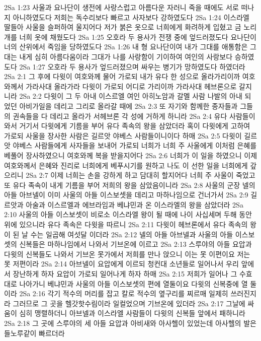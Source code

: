 2Sa 1:23  사울과 요나단이 생전에 사랑스럽고 아름다운 자러니 죽을 때에도 서로 떠나지 아니하였도다 저희는 독수리보다 빠르고 사자보다 강하였도다
2Sa 1:24  이스라엘 딸들아 사울을 슬퍼하여 울지어다 저가 붉은 옷으로 너희에게 화려하게 입혔고 금 노리개를 너희 옷에 채웠도다
2Sa 1:25  오호라 두 용사가 전쟁 중에 엎드러졌도다 요나단이 너의 산위에서 죽임을 당하였도다
2Sa 1:26  내 형 요나단이여 내가 그대를 애통함은 그대는 내게 심히 아름다움이라 그대가 나를 사랑함이 기이하여 여인의 사랑보다 승하였도다
2Sa 1:27  오호라 두 용사가 엎드러졌으며 싸우는 병기가 망하였도다 하였더라
2Sa 2:1  그 후에 다윗이 여호와께 물어 가로되 내가 유다 한 성으로 올라가리이까 여호와께서 가라사대 올라가라 다윗이 가로되 어디로 가리이까 가라사대 헤브론으로 갈지니라
2Sa 2:2  다윗이 그 두 아내 이스르엘 여인 아히노암과 갈멜 사람 나발의 아내 되었던 아비가일을 데리고 그리로 올라갈 때에
2Sa 2:3  또 자기와 함께한 종자들과 그들의 권속들을 다 데리고 올라가 서헤브론 각 성에 거하게 하니라
2Sa 2:4  유다 사람들이 와서 거기서 다윗에게 기름을 부어 유다 족속의 왕을 삼았더라 혹이 다윗에게 고하여 가로되 사울을 장사한 사람은 길르앗 야베스 사람들이니이다 하매
2Sa 2:5  다윗이 길르앗 야베스 사람들에게 사자들을 보내어 가로되 너희가 너희 주 사울에게 이처럼 은혜를 베풀어 장사하였으니 여호와께 복을 받을지어다
2Sa 2:6  너희가 이 일을 하였으니 이제 여호와께서 은혜와 진리로 너희에게 베푸시기를 원하고 나도 이 선한 일을 너희에게 갚으리니
2Sa 2:7  이제 너희는 손을 강하게 하고 담대히 할지어다 너희 주 사울이 죽었고 또 유다 족속이 내게 기름을 부어 저희의 왕을 삼았음이니라
2Sa 2:8  사울의 군장 넬의 아들 아브넬이 이미 사울의 아들 이스보셋을 데리고 마하나임으로 건너가서
2Sa 2:9  길르앗과 아술과 이스르엘과 에브라임과 베냐민과 온 이스라엘의 왕을 삼았더라
2Sa 2:10  사울의 아들 이스보셋이 비로소 이스라엘 왕이 될 때에 나이 사십세며 두해 동안 위에 있으니라 유다 족속은 다윗을 따르니
2Sa 2:11  다윗이 헤브론에서 유다 족속의 왕이 된 날 수는 일곱해 여섯달 이더라
2Sa 2:12  넬의 아들 아브넬과 사울의 아들 이스보셋의 신복들은 마하나임에서 나와서 기브온에 이르고
2Sa 2:13  스루야의 아들 요압과 다윗의 신복들도 나와서 기브온 못가에서 저희를 만나 앉으니 이는 못 이편이요 저는 못 저편이라
2Sa 2:14  아브넬이 요압에게 이르되 청컨대 소년들로 일어나서 우리 앞에서 장난하게 하자 요압이 가로되 일어나게 하자 하매
2Sa 2:15  저희가 일어나 그 수효대로 나아가니 베냐민과 사울의 아들 이스보셋의 편에 열둘이요 다윗의 신복중에 열 둘이라
2Sa 2:16  각기 적수의 머리를 잡고 칼로 적수의 옆구리를 찌르매 일제히 쓰러진지라 그러므로 그 곳을 헬갓핫수림이라 일컬었으며 기브온에 있더라
2Sa 2:17  그날에 싸움이 심히 맹렬하더니 아브넬과 이스라엘 사람들이 다윗의 신복들 앞에서 패하니라
2Sa 2:18  그 곳에 스루야의 세 아들 요압과 아비새와 아사헬이 있었는데 아사헬의 발은 들노루같이 빠르더라
